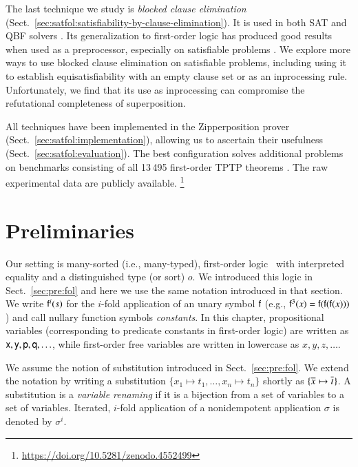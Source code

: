 The last technique we study is \emph{blocked clause elimination} (Sect.\
\ref{sec:satfol:satisfiability-by-clause-elimination}). It is used in both SAT
\cite{jbh-10-BCE} and QBF solvers \cite{bls-11-bloqqer}. Its generalization to first-order
logic has produced good results when used as a preprocessor, especially on
satisfiable problems \cite{ksstb-2017-blockedfol}. We explore more ways to use
blocked clause elimination on satisfiable problems, including using it to
establish equisatisfiability with an empty clause set or as an inprocessing
rule. Unfortunately, we find that its use as inprocessing can compromise the
refutational completeness of superposition.


All techniques have been implemented in the Zipperposition prover
(Sect.~\ref{sec:satfol:implementation}), allowing us to ascertain their usefulness
(Sect.~\ref{sec:satfol:evaluation}). The best configuration solves \NumberOK{160}
additional problems on benchmarks consisting of all 13\,495 first-order TPTP theorems
\cite{gs-17-tptp}. The raw experimental data are publicly available.%
\footnote{\url{https://doi.org/10.5281/zenodo.4552499}}

\section{Preliminaries}
\label{sec:satfol:preliminaries}

Our setting is many-sorted (i.e., many-typed), first-order
logic~\cite{jg-1987-logic-textbook} with interpreted equality and a
distinguished type (or sort) $o$. We introduced this logic in
Sect.~\ref{sec:pre:fol} and here we use the same notation introduced in that section.
We write $\mathsf{f}^i(s)$ for the $i$-fold application of an unary symbol
$\mathsf{f}$ (e.g., $\mathsf{f}^3(x) = \mathsf{f}(\mathsf{f}(\mathsf{f}(x)))$) and call nullary
function symbols \emph{constants}. In this chapter, propositional variables
(corresponding to predicate constants in first-order logic) are written as
$\mathsf{x}, \mathsf{y}, \mathsf{p}, \mathsf{q}, \ldots$, while first-order free variables
are written in lowercase as $x,y,z,\ldots$.

We assume the notion of substitution introduced in Sect.~\ref{sec:pre:fol}.
We extend the notation by writing a substitution $\{x_1 \mapsto t_1,
\ldots,\allowbreak x_n \mapsto t_n\}$ shortly as $\{ \overline{x}_{} \mapsto \overline{t}_{} \}$.
A substitution is a \emph{variable renaming} if it is a
bijection from a set of variables to a set of variables. Iterated, $i$-fold application 
of a nonidempotent application $\sigma$ is denoted by $\sigma^i$.


